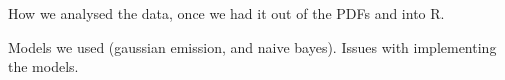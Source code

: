 How we analysed the data, once we had it out of the PDFs and into R.

Models we used (gaussian emission, and naive bayes). Issues with implementing the models.